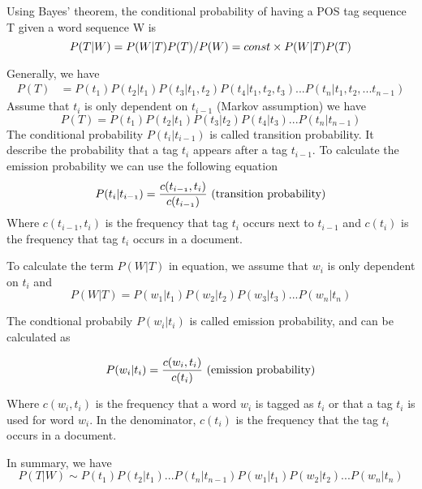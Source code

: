 \documentclass[12pt, oneside]{article}
\begin{document}
Using Bayes' theorem, the conditional probability of having a POS tag sequence T given a word sequence W is 
\begin{equation}
\mathnormal{P(T | W) = P(W|T) P(T) / P(W) = const \times P(W|T) P(T)}
\end{equation}

Generally, we have 
\begin{align*}
P(T)&= P(t_1) P(t_2 | t_1) P(t_3 | t_1, t_2) P(t_4 | t_1, t_2, t_3)  ...P(t_n | t_{1}, t_{2}, ... t_{n-1})
\end{align*}
Assume that ${t_i}$ is only dependent on ${t_{i-1}}$ (Markov assumption) we have 
\begin{equation}
P(T)=P(t_1) P(t_2 | t_1) P(t_3 | t_2) P(t_4 |  t_3)  ...P(t_n | t_{n-1})
\end{equation}
The conditional probability $P(t_i|t_{i-1})$ is called transition probability. It describe the probability that a tag $t_i$ appears after a tag $t_{i-1}$. To calculate the emission probability we can use the following equation
\begin{equation}
\mathnormal{P(t_{i}|t_{i-1}) = \frac{c(t_{i-1},t_{i})}{c(t_{i-1})}} \text{ (transition probability)}
\end{equation}
Where $c(t_{i-1},t_{i})$ is the frequency that tag $t_i$ occurs next to $t_{i-1}$ and $c(t_{i})$ is the frequency that tag $t_i$ occurs in a document.

To calculate the term $P(W|T)$ in equation, we assume that $w_i$ is only dependent on $t_i$ and  
\begin{equation}
P(W|T) = P(w_1 | t_1) P(w_2 | t_2) P(w_3 | t_3)  ...P(w_n | t_{n})
\end{equation}

The condtional probabily $P(w_i|t_i)$ is called emission probability, and can be calculated as 

\begin{equation}
\mathnormal{P(w_i|t_i) = \frac{c(w_i,t_i)}{c(t_i)}} \text{ (emission probability)}
\end{equation}

Where $c(w_i, t_i)$ is the frequency that a word $w_i$ is tagged as $t_i$ or that a tag $t_i$ is used for word $w_i$. In the denominator, $c(t_i)$ is the frequency that the tag $t_i$ occurs in a document.

In summary, we have 
\begin{equation}
{P(T|W) \sim P(t_1) P(t_2|t_1) ... P(t_{n}|t_{n-1}) P(w_1|t_1) P(w_2|t_2) ... P(w_n|t_n)}
\end{equation}
\end{document}

